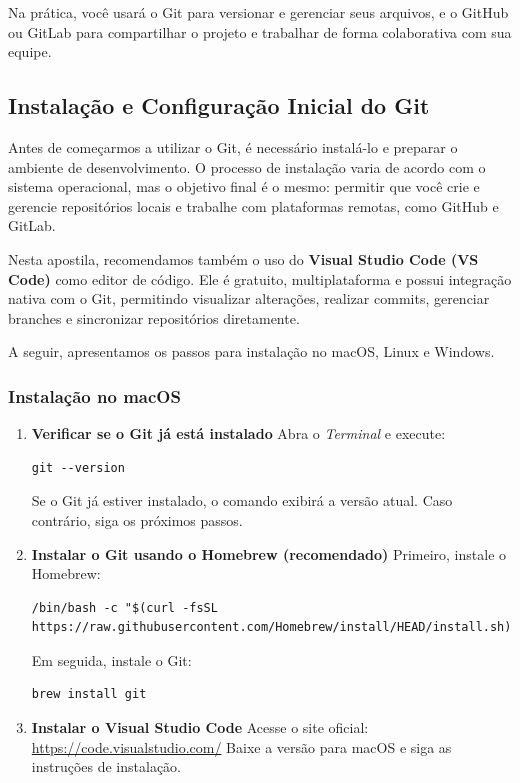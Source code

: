 Na prática, você usará o Git para versionar e gerenciar seus arquivos, e o GitHub ou GitLab para compartilhar o projeto e trabalhar de forma colaborativa com sua equipe.

\subsection{Instalação e Configuração Inicial do Git}

Antes de começarmos a utilizar o Git, é necessário instalá-lo e preparar o ambiente de desenvolvimento. O processo de instalação varia de acordo com o sistema operacional, mas o objetivo final é o mesmo: permitir que você crie e gerencie repositórios locais e trabalhe com plataformas remotas, como GitHub e GitLab.

Nesta apostila, recomendamos também o uso do \textbf{Visual Studio Code (VS Code)} como editor de código. Ele é gratuito, multiplataforma e possui integração nativa com o Git, permitindo visualizar alterações, realizar commits, gerenciar branches e sincronizar repositórios diretamente.

A seguir, apresentamos os passos para instalação no macOS, Linux e Windows.

\subsubsection*{Instalação no macOS}

\begin{enumerate}
    \item \textbf{Verificar se o Git já está instalado}  
    Abra o \textit{Terminal} e execute:
    \begin{lstlisting}[style=shellstyle]
 git --version
    \end{lstlisting}
    Se o Git já estiver instalado, o comando exibirá a versão atual. Caso contrário, siga os próximos passos.

    \item \textbf{Instalar o Git usando o Homebrew (recomendado)}  
    Primeiro, instale o Homebrew:
    \begin{lstlisting}[style=shellstyle]
/bin/bash -c "$(curl -fsSL https://raw.githubusercontent.com/Homebrew/install/HEAD/install.sh)"
    \end{lstlisting}
    Em seguida, instale o Git:
    \begin{lstlisting}[style=shellstyle]
brew install git
    \end{lstlisting}

    \item \textbf{Instalar o Visual Studio Code}  
    Acesse o site oficial:  
    \url{https://code.visualstudio.com/}  
    Baixe a versão para macOS e siga as instruções de instalação.
\end{enumerate}

